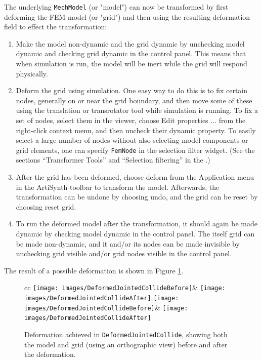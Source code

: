 The underlying {\tt MechModel} (or "model") can now be
transformed by first deforming the FEM model (or "grid") and
then using the resulting deformation field to effect the
transformation:

\begin{enumerate}

\item Make the model non-dynamic and the grid dynamic by unchecking
{\sf model dynamic} and checking {\sf grid dynamic} in the control
panel. This means that when simulation is run, the model will be inert
while the grid will respond physically.

\item Deform the grid using simulation. One easy way to do this is to
fix certain nodes, generally on or near the grid boundary, and then
move some of these using the translation or transrotator
tool while simulation is running. To fix a set of nodes, select
them in the viewer, choose {\sf Edit properties ...} from the
right-click context menu, and then uncheck their {\sf dynamic} property.
To easily select a large number of nodes without also selecting
model components or grid elements, one can specify {\tt FemNode}
in the selection filter widget. (See the sections
``Transformer Tools'' and ``Selection filtering'' in the
.)

\item After the grid has been deformed, choose {\sf deform} from the
{\sf Application} menu in the ArtiSynth toolbar to transform the model.
Afterwards, the transformation can be undone by choosing {\sf undo},
and the grid can be reset by choosing {\sf reset grid}.

\item To run the deformed model after the transformation, it should
again be made dynamic by checking {\sf model dynamic} in the control
panel.  The itself grid can be made non-dynamic, and it and/or its
nodes can be made invisible by unchecking {\sf grid visible} and/or
{\sf grid nodes visible} in the control panel.

\end{enumerate}

The result of a possible deformation is shown in Figure
\ref{JointedCollideDeformation:fig}.

\begin{figure}[ht]
\begin{center}
  \begin{tabular}{cc}
  \iflatexml
    \texttt{[image: images/DeformedJointedCollideBefore]}&
    \texttt{[image: images/DeformedJointedCollideAfter]}
  \else
    \texttt{[image: images/DeformedJointedCollideBefore]}&
    \texttt{[image: images/DeformedJointedCollideAfter]}
  \fi
  \end{tabular}
\end{center}
\caption{Deformation achieved in {\tt DeformedJointedCollide},
showing both the model and grid (using an orthographic view)
before and after the deformation.}
\label{JointedCollideDeformation:fig}
\end{figure}

